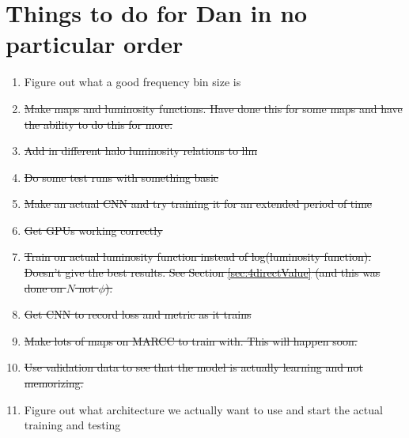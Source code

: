 \documentclass{article}
\begin{document}
	\section{Things to do for Dan in no particular order}
		\begin{enumerate}
			\item Figure out what a good frequency bin size is

			\item \sout{Make maps and luminosity functions. Have done this for some maps and have the ability to do this for more.}

			\item \sout{Add in different halo luminosity relations to llm}

			\item \sout{Do some test runs with something basic}

			\item \sout{Make an actual CNN and try training it for an extended period of time}

			\item \sout{Get GPUs working correctly}

			\item \sout{Train on actual luminosity function instead of log(luminosity function). Doesn't give the best results.  See Section \ref{sec:4directValue} (and this was done on \(N\) not \(\phi\)).}

			\item \sout{Get CNN to record loss and metric as it trains}

			\item \sout{Make lots of maps on MARCC to train with.  This will happen soon.}

			\item \sout{Use validation data to see that the model is actually learning and not memorizing.}

			\item Figure out what architecture we actually want to use and start the actual training and testing
		\end{enumerate}


	
% 
\end{document}
